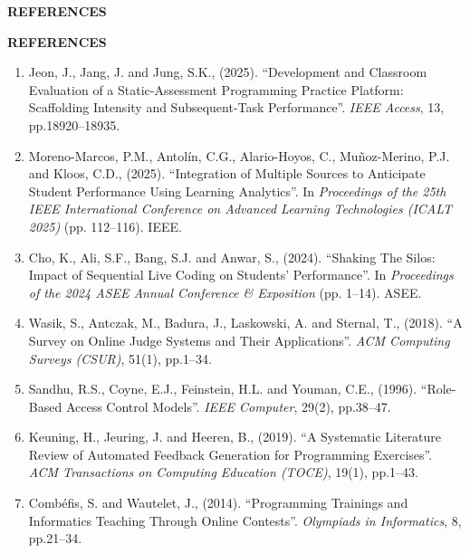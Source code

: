 \vspace*{\fill}
\begin{center}
  {\fontsize{18pt}{24pt}\selectfont\bfseries REFERENCES\par}
\end{center}
\vspace*{\fill}
\newpage

\begin{center}
  {\fontsize{16pt}{20pt}\selectfont\bfseries REFERENCES\par}
\end{center}
\vspace{0.4cm}

{\fontsize{11.5pt}{16.5pt}\selectfont
\begin{enumerate}[noitemsep,topsep=2pt,leftmargin=*]
  \item Jeon, J., Jang, J. and Jung, S.K., (2025). ``Development and Classroom Evaluation of a Static-Assessment Programming Practice Platform: Scaffolding Intensity and Subsequent-Task Performance''. \textit{IEEE Access}, 13, pp.18920--18935.
  \item Moreno-Marcos, P.M., Antol\'{i}n, C.G., Alario-Hoyos, C., Mu\~{n}oz-Merino, P.J. and Kloos, C.D., (2025). ``Integration of Multiple Sources to Anticipate Student Performance Using Learning Analytics''. In \textit{Proceedings of the 25th IEEE International Conference on Advanced Learning Technologies (ICALT 2025)} (pp. 112--116). IEEE.
  \item Cho, K., Ali, S.F., Bang, S.J. and Anwar, S., (2024). ``Shaking The Silos: Impact of Sequential Live Coding on Students' Performance''. In \textit{Proceedings of the 2024 ASEE Annual Conference \& Exposition} (pp. 1--14). ASEE.
  \item Wasik, S., Antczak, M., Badura, J., Laskowski, A. and Sternal, T., (2018). ``A Survey on Online Judge Systems and Their Applications''. \textit{ACM Computing Surveys (CSUR)}, 51(1), pp.1--34.
  \item Sandhu, R.S., Coyne, E.J., Feinstein, H.L. and Youman, C.E., (1996). ``Role-Based Access Control Models''. \textit{IEEE Computer}, 29(2), pp.38--47.
  \item Keuning, H., Jeuring, J. and Heeren, B., (2019). ``A Systematic Literature Review of Automated Feedback Generation for Programming Exercises''. \textit{ACM Transactions on Computing Education (TOCE)}, 19(1), pp.1--43.
  \item Comb\'{e}fis, S. and Wautelet, J., (2014). ``Programming Trainings and Informatics Teaching Through Online Contests''. \textit{Olympiads in Informatics}, 8, pp.21--34.

\end{enumerate}}
